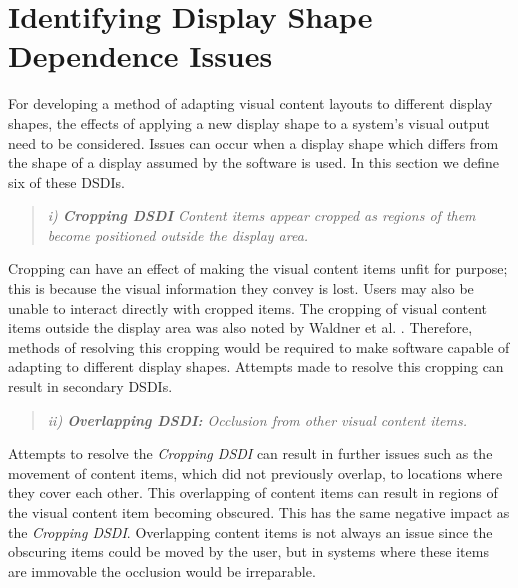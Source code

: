 \documentclass{bmcart}
\begin{document}
\section*{Identifying Display Shape Dependence Issues}
\label{sec:problem}

For developing a method of adapting visual content layouts to different display shapes, the effects of applying a new display shape to a system's visual output need to be considered.
Issues can occur when a display shape which differs from the shape of a display assumed by the software is used.
In this section we define six of these \acp{DSDI}.



\begin{quote}\emph{i) \textbf{Cropping \ac{DSDI}} Content items appear cropped as regions of them become positioned outside the display area.}\end{quote}

Cropping can have an effect of making the visual content items unfit for purpose; this is because the visual information they convey is lost.
Users may also be unable to interact directly with cropped items.
The cropping of visual content items outside the display area was also noted by Waldner et al. \cite{Waldner2011}.
Therefore, methods of resolving this cropping would be required to make software capable of adapting to different display shapes.
Attempts made to resolve this cropping can result in secondary \acp{DSDI}.

\begin{quote}\emph{ii) \textbf{Overlapping \ac{DSDI}:} Occlusion from other visual content items.}\end{quote}

Attempts to resolve the {\emph{Cropping \ac{DSDI}}} can result in further issues such as the movement of content items, which did not previously overlap, to locations where they cover each other.
This overlapping of content items can result in regions of the visual content item becoming obscured.
This has the same negative impact as the {\emph{Cropping \ac{DSDI}}}.
Overlapping content items is not always an issue since the obscuring items could be moved by the user, but in systems where these items are immovable the occlusion would be irreparable.
\end{document}
